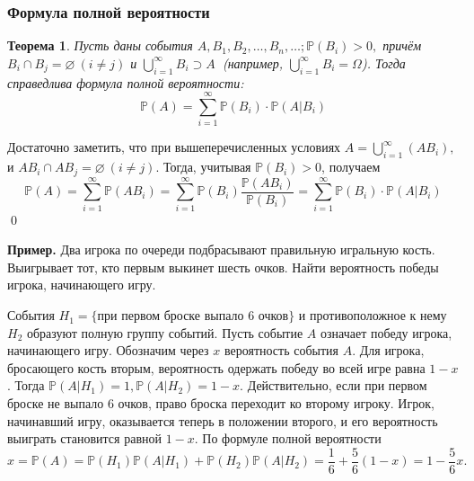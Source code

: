 \documentclass[oneside,final,14pt]{extreport}
\newcommand\myex{{\bf Пример.}}
\newcommand\myprob[1]{{\mathbb{P}(#1)}}
\renewenvironment{proof}{{\bfseries Доказательство.}}{\qed}
\newtheorem{thm}{Теорема}[section]
\theoremstyle{definition}
\begin{document}
\subsubsection{Формула полной вероятности}
\begin{thm}
    Пусть даны события $A, B_1, B_2, \ldots, B_n, \ldots; \myprob{B_i} > 0, $ причём $B_i \cap B_j = \varnothing~(i \neq j)$ и $\bigcup\limits_{i=1}^{\infty}B_i \supset A~$ (например, $\bigcup\limits_{i=1}^{\infty}B_i = \Omega$). Тогда справедлива {\it формула полной вероятности:}
\begin{equation*}
    \mathbb{P}(A)=\sum_{i=1}^{\infty} \mathbb{P}\left(B_{i}\right) \cdot \mathbb{P}\left(A | B_{i}\right)
\end{equation*}
\end{thm}

\begin{proof}
    Достаточно заметить, что при вышеперечисленных условиях $A = \bigcup\limits_{i=1}^{\infty}(AB_i),$ и $AB_i \cap AB_j = \varnothing ~(i \neq j).$ Тогда, учитывая $\myprob{B_i} > 0$, получаем
    \begin{equation*}
        \mathbb{P}(A)=\sum_{i=1}^{\infty} \mathbb{P}\left(A B_{i}\right)=\sum_{i=1}^{\infty} \mathbb{P}\left(B_{i}\right) \frac{\mathbb{P}\left(A B_{i}\right)}{\mathbb{P}\left(B_{i}\right)}=\sum_{i=1}^{\infty} \mathbb{P}\left(B_{i}\right) \cdot \mathbb{P}\left(A | B_{i}\right)
    \end{equation*}
\end{proof}

\myex{} Два игрока по очереди подбрасывают правильную игральную кость. Выигрывает тот, кто первым выкинет шесть очков. Найти вероятность победы игрока, начинающего игру.

События $H_1 = \text{\{при первом броске выпало 6 очков\}}$ и противоположное к нему $H_2$ образуют полную группу событий. Пусть событие $A$
означает победу игрока, начинающего игру. Обозначим через $x$ вероятность
события $A$. Для игрока, бросающего кость вторым, вероятность одержать
победу во всей игре равна $1 - x$. Тогда $\myprob{A | H_1} = 1, \myprob{A | H_2} = 1 - x$. Действительно, если при первом броске не выпало 6 очков, право броска переходит ко второму игроку. Игрок, начинавший игру, оказывается теперь в положении второго, и его вероятность выиграть становится равной $1 - x$. По формуле полной вероятности
$$x=\mathbb{P}(A)=\mathbb{P}\left(H_{1}\right) \mathbb{P}\left(A | H_{1}\right)+\mathbb{P}\left(H_{2}\right) \mathbb{P}\left(A | H_{2}\right)=\frac{1}{6}+\frac{5}{6}(1-x)=1-\frac{5}{6} x.$$
\end{document}
